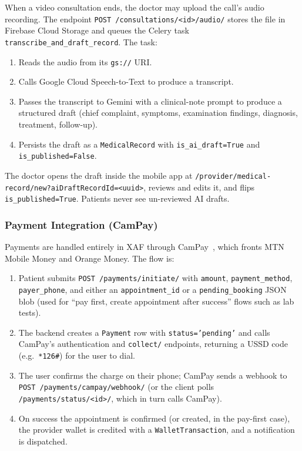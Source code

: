 When a video consultation ends, the doctor may upload the call's audio recording. The endpoint \texttt{POST /consultations/<id>/audio/} stores the file in Firebase Cloud Storage and queues the Celery task \texttt{transcribe\_and\_draft\_record}. The task:

\begin{enumerate}
  \item Reads the audio from its \texttt{gs://} URI.
  \item Calls Google Cloud Speech-to-Text to produce a transcript.
  \item Passes the transcript to Gemini with a clinical-note prompt to produce a structured draft (chief complaint, symptoms, examination findings, diagnosis, treatment, follow-up).
  \item Persists the draft as a \texttt{MedicalRecord} with \texttt{is\_ai\_draft=True} and \texttt{is\_published=False}.
\end{enumerate}

The doctor opens the draft inside the mobile app at \texttt{/provider/medical-record/new?aiDraftRecordId=<uuid>}, reviews and edits it, and flips \texttt{is\_published=True}. Patients never see un-reviewed AI drafts.

\subsubsection*{Payment Integration (CamPay)}

Payments are handled entirely in XAF through CamPay~\cite{campay_docs}, which fronts MTN Mobile Money and Orange Money. The flow is:

\begin{enumerate}
  \item Patient submits \texttt{POST /payments/initiate/} with \texttt{amount}, \texttt{payment\_method}, \texttt{payer\_phone}, and either an \texttt{appointment\_id} or a \texttt{pending\_booking} JSON blob (used for ``pay first, create appointment after success'' flows such as lab tests).
  \item The backend creates a \texttt{Payment} row with \texttt{status='pending'} and calls CamPay's authentication and \texttt{collect/} endpoints, returning a USSD code (e.g.\ \texttt{*126\#}) for the user to dial.
  \item The user confirms the charge on their phone; CamPay sends a webhook to \texttt{POST /payments/campay/webhook/} (or the client polls \texttt{/payments/status/<id>/}, which in turn calls CamPay).
  \item On success the appointment is confirmed (or created, in the pay-first case), the provider wallet is credited with a \texttt{WalletTransaction}, and a notification is dispatched.
\end{enumerate}


